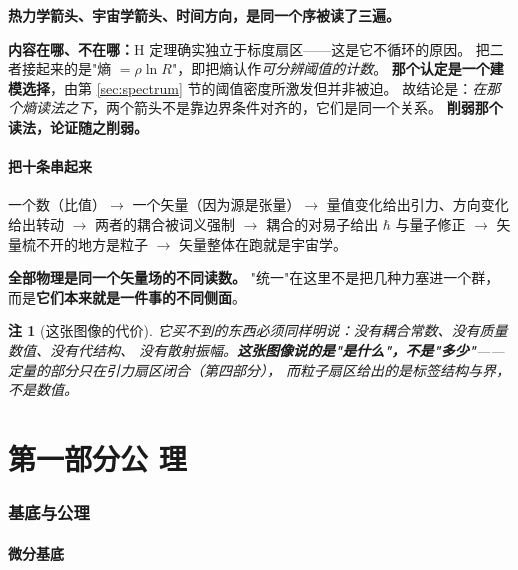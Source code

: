 \documentclass[11pt,a4paper]{article}
\theoremstyle{sudef}
\newtheorem{remark}[theorem]{注}
\begin{document}
\begin{mdframed}[linecolor=axcol,linewidth=1pt,backgroundcolor=axcol!5]
\textbf{热力学箭头、宇宙学箭头、时间方向，是同一个序被读了三遍。}

\textbf{内容在哪、不在哪：}H 定理确实独立于标度扇区——这是它不循环的原因。
把二者接起来的是"熵 $=\rho\ln R$"，即把熵认作\emph{可分辨阈值的计数}。
\textbf{那个认定是一个建模选择}，由第 \ref{sec:spectrum} 节的阈值密度所激发但并非被迫。
故结论是：\emph{在那个熵读法之下}，两个箭头不是靠边界条件对齐的，它们是同一个关系。
\textbf{削弱那个读法，论证随之削弱。}
\end{mdframed}

\subsection{把十条串起来}

\begin{mdframed}[linecolor=axcol,linewidth=1.2pt,backgroundcolor=axcol!6]
一个数（比值）$\to$ 一个矢量（因为源是张量）$\to$
量值变化给出引力、方向变化给出转动 $\to$
两者的耦合被词义强制 $\to$ 耦合的对易子给出 $\hbar$ 与量子修正 $\to$
矢量梳不开的地方是粒子 $\to$ 矢量整体在跑就是宇宙学。

\textbf{全部物理是同一个矢量场的不同读数。}
"统一"在这里不是把几种力塞进一个群，而是\textbf{它们本来就是一件事的不同侧面}。
\end{mdframed}

\begin{remark}[这张图像的代价]
它买不到的东西必须同样明说：没有耦合常数、没有质量数值、没有代结构、
没有散射振幅。\textbf{这张图像说的是"是什么"，不是"多少"}——
定量的部分只在引力扇区闭合（第四部分），
而粒子扇区给出的是\emph{标签结构}与\emph{界}，不是数值。
\end{remark}

\clearpage

\clearpage
\part{第一部分\quad 公 理}

\section{基底与公理}\label{sec:axioms}

\subsection{微分基底}
\end{document}
